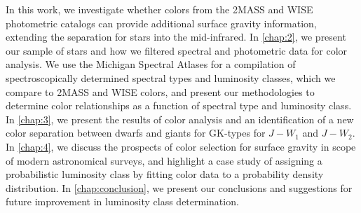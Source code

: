 In this work, we investigate whether colors from the 2MASS and WISE photometric catalogs can provide additional surface gravity information, extending the separation for stars into the mid-infrared. In \autoref{chap:2}, we present our sample of stars and how we filtered spectral and photometric data for color analysis. We use the Michigan Spectral Atlases for a compilation of spectroscopically determined spectral types and luminosity classes, which we compare to 2MASS and WISE colors, and present our methodologies to determine color relationships as a function of spectral type and luminosity class.  In \autoref{chap:3}, we present the results of color analysis and an identification of a new color separation between dwarfs and giants for GK-types for $J-W_{1}$ and  $J-W_{2}$. In \autoref{chap:4}, we discuss the prospects of color selection for surface gravity in scope of modern astronomical surveys, and highlight a case study of assigning a probabilistic luminosity class by fitting color data to a probability density distribution. In \autoref{chap:conclusion}, we present our conclusions and suggestions for future improvement in luminosity class determination.




